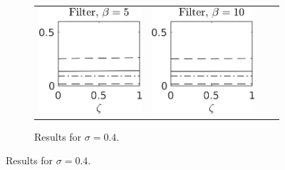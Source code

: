\documentclass[10pt]{article}
\begin{document}
\begin{figure}[t]
\begin{subfigure}{\linewidth}
\begin{tabular}{cccc}
			\includegraphics[]{Figures/A2_filt_s4_b5.png} & \includegraphics[]{Figures/A2_filt_s4_b10.png}
		\end{tabular}	
		\caption{Results for $\sigma = 0.4$.}
	\end{subfigure}
	

\end{figure}
\end{document}
